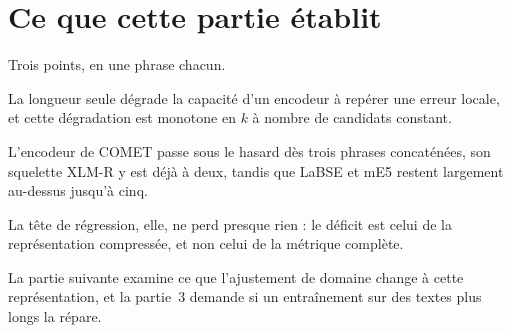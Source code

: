 \documentclass[11pt]{article}
\begin{document}
\section{Ce que cette partie établit}

Trois points, en une phrase chacun.

La longueur seule dégrade la capacité d'un encodeur à repérer une erreur locale, et cette dégradation est monotone en $k$ à nombre de candidats constant.

L'encodeur de COMET passe sous le hasard dès trois phrases concaténées, son squelette XLM-R y est déjà à deux, tandis que LaBSE et mE5 restent largement au-dessus jusqu'à cinq.

La tête de régression, elle, ne perd presque rien : le déficit est celui de la représentation compressée, et non celui de la métrique complète.

La partie suivante examine ce que l'ajustement de domaine change à cette représentation, et la partie~3 demande si un entraînement sur des textes plus longs la répare.



\end{document}
